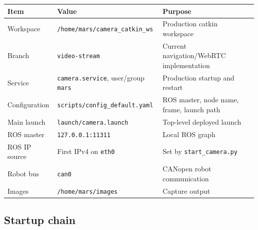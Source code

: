 \documentclass[
  10pt,
  letterpaper,
  openany]{report}
\newcounter{none} %
\begin{document}
{\def\LTcaptype{none} %
\begin{longtable}[]{@{}
  >{\raggedright\arraybackslash}p{}
  >{\raggedright\arraybackslash}p{}
  >{\raggedright\arraybackslash}p{}@{}}
\toprule\noalign{}
\begin{minipage}[b]{\linewidth}\raggedright
Item
\end{minipage} & \begin{minipage}[b]{\linewidth}\raggedright
Value
\end{minipage} & \begin{minipage}[b]{\linewidth}\raggedright
Purpose
\end{minipage} \\
\midrule\noalign{}
\endhead
\bottomrule\noalign{}
\endlastfoot
Workspace & \texttt{/home/mars/camera\_catkin\_ws} & Production catkin
workspace \\
Branch & \texttt{video-stream} & Current navigation/WebRTC
implementation \\
Service & \texttt{camera.service}, user/group \texttt{mars} & Production
startup and restart \\
Configuration & \texttt{scripts/config\_default.yaml} & ROS master, node
name, frame, launch path \\
Main launch & \texttt{launch/camera.launch} & Top-level deployed
launch \\
ROS master & \texttt{127.0.0.1:11311} & Local ROS graph \\
ROS IP source & First IPv4 on \texttt{eth0} & Set by
\texttt{start\_camera.py} \\
Robot bus & \texttt{can0} & CANopen robot communication \\
Images & \texttt{/home/mars/images} & Capture output \\
\end{longtable}
}

\subsection{Startup chain}\label{startup-chain}
\end{document}
